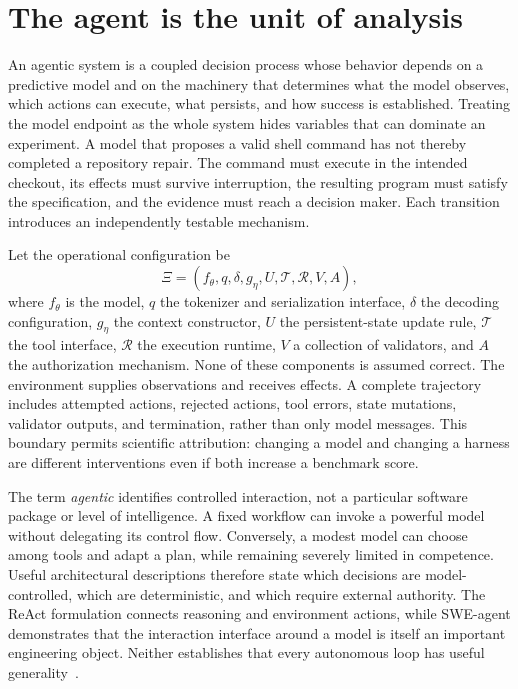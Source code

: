 \section{The agent is the unit of analysis}\label{sec:C01:01}
An agentic system is a coupled decision process whose behavior depends on a predictive model and on the machinery that determines what the model observes, which actions can execute, what persists, and how success is established. Treating the model endpoint as the whole system hides variables that can dominate an experiment. A model that proposes a valid shell command has not thereby completed a repository repair. The command must execute in the intended checkout, its effects must survive interruption, the resulting program must satisfy the specification, and the evidence must reach a decision maker. Each transition introduces an independently testable mechanism.

Let the operational configuration be
\begin{equation}
 \Xi=(f_\theta,q,\delta,g_\eta,U,\mathcal T,\mathcal R,V,A),
 \label{eq:c01:configuration}
\end{equation}
where $f_\theta$ is the model, $q$ the tokenizer and serialization interface, $\delta$ the decoding configuration, $g_\eta$ the context constructor, $U$ the persistent-state update rule, $\mathcal T$ the tool interface, $\mathcal R$ the execution runtime, $V$ a collection of validators, and $A$ the authorization mechanism. None of these components is assumed correct. The environment supplies observations and receives effects. A complete trajectory includes attempted actions, rejected actions, tool errors, state mutations, validator outputs, and termination, rather than only model messages. This boundary permits scientific attribution: changing a model and changing a harness are different interventions even if both increase a benchmark score.

The term \emph{agentic} identifies controlled interaction, not a particular software package or level of intelligence. A fixed workflow can invoke a powerful model without delegating its control flow. Conversely, a modest model can choose among tools and adapt a plan, while remaining severely limited in competence. Useful architectural descriptions therefore state which decisions are model-controlled, which are deterministic, and which require external authority. The ReAct formulation connects reasoning and environment actions, while SWE-agent demonstrates that the interaction interface around a model is itself an important engineering object. Neither establishes that every autonomous loop has useful generality~\cite{yao2022react,yang2024sweagent}.

